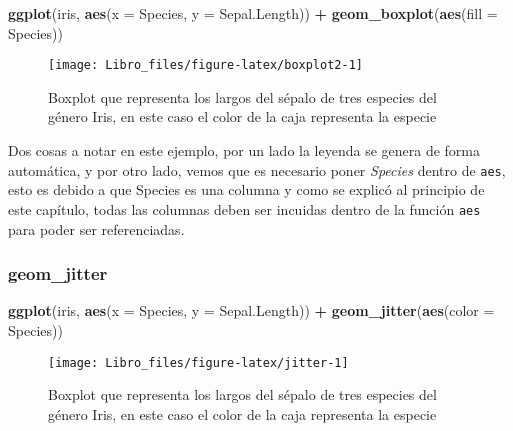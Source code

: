 \documentclass[]{book}
\newenvironment{Shaded}{\begin{snugshade}}{\end{snugshade}}
\newcommand{\DataTypeTok}[1]{\textcolor[rgb]{0.13,0.29,0.53}{#1}}
\newcommand{\KeywordTok}[1]{\textcolor[rgb]{0.13,0.29,0.53}{\textbf{#1}}}
\newcommand{\NormalTok}[1]{#1}
\newcommand{\OperatorTok}[1]{\textcolor[rgb]{0.81,0.36,0.00}{\textbf{#1}}}
\newcommand{\StringTok}[1]{\textcolor[rgb]{0.31,0.60,0.02}{#1}}
\begin{document}
\begin{Shaded}
\begin{Highlighting}[]
\KeywordTok{ggplot}\NormalTok{(iris, }\KeywordTok{aes}\NormalTok{(}\DataTypeTok{x =}\NormalTok{ Species, }\DataTypeTok{y =}\NormalTok{ Sepal.Length)) }\OperatorTok{+}\StringTok{ }\KeywordTok{geom_boxplot}\NormalTok{(}\KeywordTok{aes}\NormalTok{(}\DataTypeTok{fill =}\NormalTok{ Species))}
\end{Highlighting}
\end{Shaded}

\begin{figure}

{\centering \texttt{[image: Libro\_files/figure-latex/boxplot2-1]} 

}

\caption{Boxplot que representa los largos del sépalo de tres especies del género Iris, en este caso el color de la caja representa la especie}\label{fig:boxplot2}
\end{figure}

Dos cosas a notar en este ejemplo, por un lado la leyenda se genera de
forma automática, y por otro lado, vemos que es necesario poner
\emph{Species} dentro de \texttt{aes}, esto es debido a que Species es
una columna y como se explicó al principio de este capítulo, todas las
columnas deben ser incuidas dentro de la función \texttt{aes} para poder
ser referenciadas.

\hypertarget{geom_jitter}{%
\subsubsection{geom\_jitter}\label{geom_jitter}}

\begin{Shaded}
\begin{Highlighting}[]
\KeywordTok{ggplot}\NormalTok{(iris, }\KeywordTok{aes}\NormalTok{(}\DataTypeTok{x =}\NormalTok{ Species, }\DataTypeTok{y =}\NormalTok{ Sepal.Length)) }\OperatorTok{+}\StringTok{ }\KeywordTok{geom_jitter}\NormalTok{(}\KeywordTok{aes}\NormalTok{(}\DataTypeTok{color =}\NormalTok{ Species))}
\end{Highlighting}
\end{Shaded}

\begin{figure}

{\centering \texttt{[image: Libro\_files/figure-latex/jitter-1]} 

}

\caption{Boxplot que representa los largos del sépalo de tres especies del género Iris, en este caso el color de la caja representa la especie}\label{fig:jitter}
\end{figure}
\end{document}
